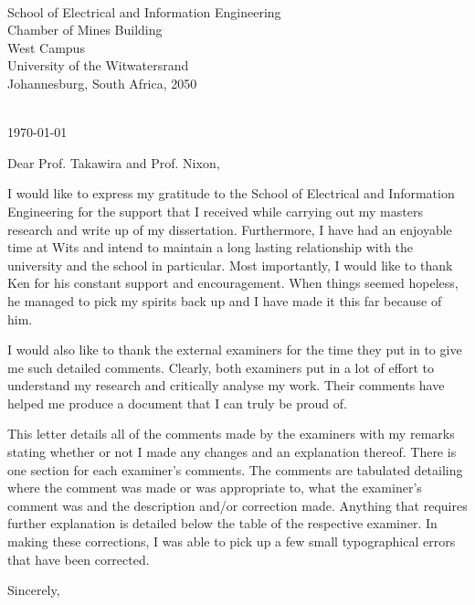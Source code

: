 \documentclass[11pt,a4paper]{letter} %
\def\opening#1{\thispagestyle{empty}
{\centering\fromaddress \vspace{0.6in} \\ %
\vfill
\today\hspace*{\fill}\par} %
{\raggedright
 \toaddress \par} %
\vspace{0.4in} %
\noindent #1 %
}
\begin{document}

\begin{letter}
{\\ School of Electrical and Information Engineering\\
Chamber of Mines Building\\
West Campus\\
University of the Witwatersrand\\
Johannesburg, South Africa, 2050\\
}


\opening{Dear Prof. Takawira and Prof. Nixon,}

I would like to express my gratitude to the School of Electrical and Information Engineering for the support that I received while carrying out my masters research and write up of my dissertation. Furthermore, I have had an enjoyable time at Wits and intend to maintain a long lasting relationship with the university and the school in particular. Most importantly, I would like to thank Ken for his constant support and encouragement. When things seemed hopeless, he managed to pick my spirits back up and I have made it this far because of him.

I would also like to thank the external examiners for the time they put in to give me such detailed comments. Clearly, both examiners put in a lot of effort to understand my research and critically analyse my work. Their comments have helped me produce a document that I can truly be proud of.

This letter details all of the comments made by the examiners with my remarks stating whether or not I made any changes and an explanation thereof. There is one section for each examiner's comments. The comments are tabulated detailing where the comment was made or was appropriate to, what the examiner's comment was and the description and/or correction made. Anything that requires further explanation is detailed below the table of the respective examiner. In making these corrections, I was able to pick up a few small typographical errors that have been corrected.

\vfill
\closing{Sincerely,}
\end{letter}
\end{document}
